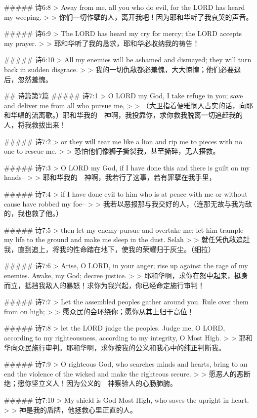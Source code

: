 ##### 诗6:8
> Away from me, all you who do evil, for the LORD has heard my weeping.
>
> 你们一切作孽的人，离开我吧！因为耶和华听了我哀哭的声音。


##### 诗6:9
> The LORD has heard my cry for mercy; the LORD accepts my prayer.
>
> 耶和华听了我的恳求，耶和华必收纳我的祷告！


##### 诗6:10
> All my enemies will be ashamed and dismayed; they will turn back in sudden disgrace.
>
> 我的一切仇敌都必羞愧，大大惊惶；他们必要退后，忽然羞愧。


## 诗篇第7篇
##### 诗7:1
> O LORD my God, I take refuge in you; save and deliver me from all who pursue me,
>
> （大卫指着便雅悯人古实的话，向耶和华唱的流离歌。）耶和华我的　神啊，我投靠你，求你救我脱离一切追赶我的人，将我救拔出来！


##### 诗7:2
> or they will tear me like a lion and rip me to pieces with no one to rescue me.
>
> 恐怕他们像狮子撕裂我，甚至撕碎，无人搭救。


##### 诗7:3
> O LORD my God, if I have done this and there is guilt on my hands--
>
> 耶和华我的　神啊，我若行了这事，若有罪孽在我手里，


##### 诗7:4
> if I have done evil to him who is at peace with me or without cause have robbed my foe--
>
> 我若以恶报那与我交好的人，（连那无故与我为敌的，我也救了他。）


##### 诗7:5
> then let my enemy pursue and overtake me; let him trample my life to the ground and make me sleep in the dust. Selah
>
> 就任凭仇敌追赶我，直到追上，将我的性命踏在地下，使我的荣耀归于灰尘。（细拉）


##### 诗7:6
> Arise, O LORD, in your anger; rise up against the rage of my enemies. Awake, my God; decree justice.
>
> 耶和华啊，求你在怒中起来，挺身而立，抵挡我敌人的暴怒！求你为我兴起，你已经命定施行审判！


##### 诗7:7
> Let the assembled peoples gather around you. Rule over them from on high;
>
> 愿众民的会环绕你；愿你从其上归于高位！


##### 诗7:8
> let the LORD judge the peoples. Judge me, O LORD, according to my righteousness, according to my integrity, O Most High.
>
> 耶和华向众民施行审判。耶和华啊，求你按我的公义和我心中的纯正判断我。


##### 诗7:9
> O righteous God, who searches minds and hearts, bring to an end the violence of the wicked and make the righteous secure.
>
> 愿恶人的恶断绝；愿你坚立义人！因为公义的　神察验人的心肠肺腑。


##### 诗7:10
> My shield is God Most High, who saves the upright in heart.
>
> 神是我的盾牌，他拯救心里正直的人。


